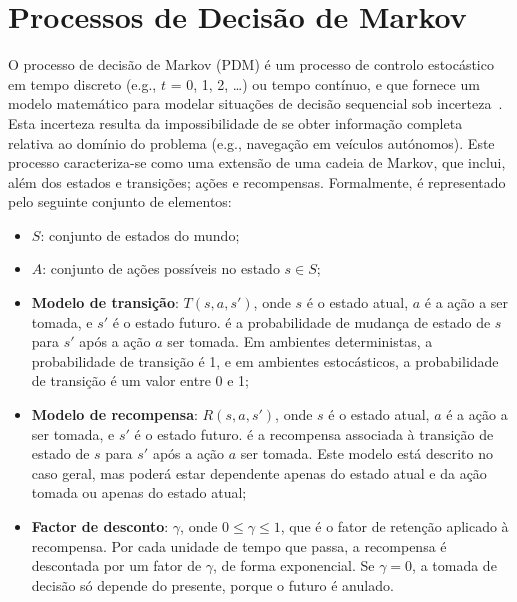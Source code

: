\section{Processos de Decisão de Markov}\label{sec:processos-de-decisao-de-markov}

O processo de decisão de Markov (PDM) é um processo de controlo estocástico em tempo discreto (e.g., $t$ = 0, 1, 2, \ldots) ou tempo contínuo, e que fornece um modelo matemático para modelar situações de decisão sequencial sob incerteza~\cite{wiki:markov-decision-process}.
Esta incerteza resulta da impossibilidade de se obter informação completa relativa ao domínio do problema (e.g., navegação em veículos autónomos).
Este processo caracteriza-se como uma extensão de uma cadeia de Markov, que inclui, além dos estados e transições; ações e recompensas.
Formalmente, é representado pelo seguinte conjunto de elementos:

\begin{itemize}
    \label{itemize:processo-decisao-markov}
    \item \textbf{$S$}: conjunto de estados do mundo;
    \item \textbf{$A$}: conjunto de ações possíveis no estado $s \in S$;
    \item \textbf{Modelo de transição}: \( T(s, a, s') \), onde \( s \) é o estado atual, \( a \) é a ação a ser tomada, e \( s' \) é o estado futuro.
    é a probabilidade de mudança de estado de \( s \) para \( s' \) após a ação \( a \) ser tomada.
    Em ambientes deterministas, a probabilidade de transição é 1, e em ambientes estocásticos, a probabilidade de transição é um valor entre 0 e 1;
    \item \textbf{Modelo de recompensa}: \( R(s, a, s') \), onde \( s \) é o estado atual, \( a \) é a ação a ser tomada, e \( s' \) é o estado futuro.
    é a recompensa associada à transição de estado de \( s \) para \( s' \) após a ação \( a \) ser tomada.
    Este modelo está descrito no caso geral, mas poderá estar dependente apenas do estado atual e da ação tomada ou apenas do estado atual;
    \item \textbf{Factor de desconto}: \( \gamma \), onde \( 0 \leq \gamma \leq 1 \), que é o fator de retenção aplicado à recompensa.
    Por cada unidade de tempo que passa, a recompensa é descontada por um fator de \( \gamma \), de forma exponencial.
    Se \( \gamma = 0 \), a tomada de decisão só depende do presente, porque o futuro é anulado.
\end{itemize}

